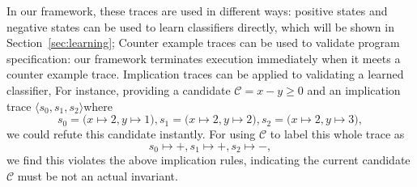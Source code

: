 In our framework, these traces are used in different ways:
positive states and negative states can be used to learn classifiers directly,
which will be shown in Section~\ref{sec:learning};
Counter example traces can be used to validate program specification:
our framework terminates execution immediately when it meets a counter example trace.
Implication traces can be applied to validating a learned classifier,
For instance, providing a candidate $\mathcal{C} = x - y \ge 0$ and an implication trace 
$\langle s_0, s_1, s_2\rangle$where 
$$s_0 = \big(x \mapsto 2, y \mapsto 1\big),  s_1 = \big(x \mapsto 2, y \mapsto 2\big),  s_2 = \big(x \mapsto 2, y \mapsto 3\big),$$
we could refute this candidate instantly.
For using $\mathcal{C}$ to label this whole trace as $$s_0 \mapsto +,  s_1 \mapsto +,  s_2 \mapsto -,$$ 
we find this violates the above implication rules,
indicating the current candidate $\mathcal{C}$ must be not an actual invariant.













